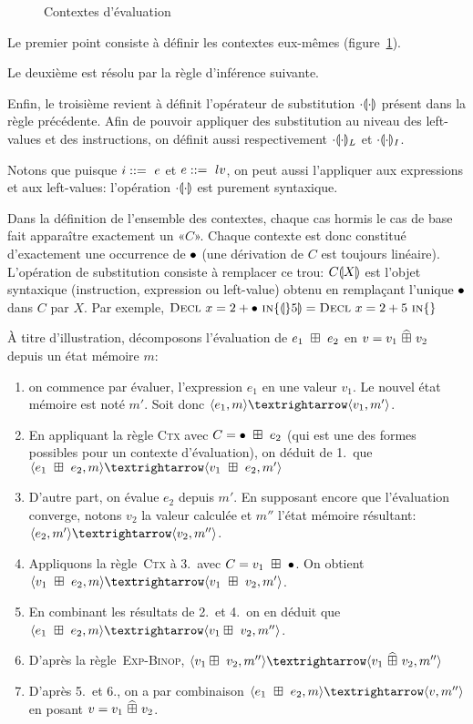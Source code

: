 \begin{figure}
\figctx{}

\caption{Contextes d'évaluation}
\label{fig:eval-ctx}
\end{figure}

Le premier point consiste à définir les contextes eux-mêmes
(figure~\ref{fig:eval-ctx}).

Le deuxième est résolu par la règle d'inférence suivante.

\begin{mathpar}
\end{mathpar}

Enfin, le troisième revient à définit l'opérateur de substitution
$\phxx{\ctxSub}$ présent dans la règle précédente. Afin de pouvoir appliquer des
substitution au niveau des left-values et des instructions, on définit aussi
respectivement $\phxx{\ctxSubL}$ et $\phxx{\ctxSubI}$.

Notons que puisque $i \gramisa e$ et $e \gramisa lv$, on peut aussi l'appliquer
aux expressions et aux left-values: l'opération $\phxx\ctxSub$ est purement
syntaxique.

Dans la définition de l'ensemble des contextes, chaque cas hormis le cas de base
fait apparaître exactement un «$C$». Chaque contexte est donc constitué
d'exactement une occurrence de $\ctxEmpty$ (une dérivation de $C$ est toujours
linéaire). L'opération de substitution consiste à remplacer ce trou:
$\ctxSub{C}{X}$ est l'objet syntaxique (instruction, expression ou left-value)
obtenu en remplaçant l'unique $\ctxEmpty$ dans $C$ par $X$. Par exemple,
$\ctxSub{\iDecl{x}{2+\ctxEmpty}}{5} = \iDecl{x}{2+5}$

À titre d'illustration, décomposons l'évaluation de $e_1~\opbin~e_2$ en $v =
v_1~\widehat{\opbin}~v_2$ depuis un état mémoire $m$:

\begin{enumerate}
\item
  on commence par évaluer, l'expression $e_1$ en une valeur $v_1$. Le nouvel
  état mémoire est noté $m'$. Soit donc $\mm{m}{e_1}{m'}{v_1}$.
\item
  En appliquant la règle \textsc{Ctx} avec $C = \ctxOp{\ctxEmpty}{e_2}$ (qui est
  une des formes possibles pour un contexte d'évaluation), on déduit de 1.\ que
  $\mm{m}{e_1~\opbin~e_2}{m'}{v_1~\opbin~e_2}$
\item
  D'autre part, on évalue $e_2$ depuis $m'$. En supposant encore que
  l'évaluation converge, notons $v_2$ la valeur calculée et $m''$ l'état mémoire
  résultant: $\mm{m'}{e_2}{m''}{v_2}$.
\item
  Appliquons la règle~\textsc{Ctx} à 3.\ avec $C = \ctxOp{v_1}{\ctxEmpty}$. On
  obtient $\mm{m}{v_1~\opbin~e_2}{m'}{v_1~\opbin~v_2}$.
\item
  En combinant les résultats de 2.\ et 4.\ on en déduit que
  $\mm{m}{e_1~\opbin~e_2}{m''}{v_1\opbin~v_2}$.
\item D'après la règle~\textsc{Exp-Binop},
  $ \mm{m''}{v_1\opbin~v_2}{m''}{v_1~\widehat{\opbin}~v_2}$
\item D'après 5.\ et 6., on a par combinaison
  $\mm{m}{e_1~\opbin~e_2}{m''}{v}$
  en posant
  $v = v_1~\widehat{\opbin}~v_2$.
\end{enumerate}


